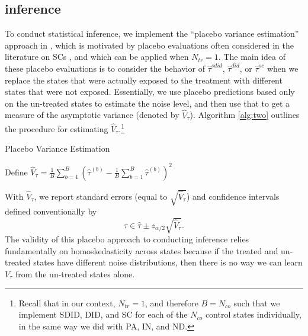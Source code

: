 \documentclass[../Main.tex]{subfiles}
\begin{document}
\subsection{inference}
To conduct statistical inference, we implement the ``placebo variance estimation'' approach in \citet{arkhangelsky2021synthetic}, which is motivated by placebo evaluations often considered in the literature on SCs \citep{abadie2010synthetic,abadie2015comparative}, and which can be applied when $N_{tr}=1$. The main idea of these placebo evaluations is to consider the behavior of $\hat{\tau}^{sdid}$, $\hat{\tau}^{did}$, or $\hat{\tau}^{sc}$ when we replace the states that were actually exposed to the treatment with different states that were not exposed. Essentially, we use placebo predictions based only on the un-treated states to estimate the noise level, and then use that to get a measure of the asymptotic variance (denoted by $\hat{V}_{\tau}$). Algorithm \ref{alg:two} outlines the procedure for estimating $\hat{V}_{\tau}$.\footnote{Recall that in our context, $N_{tr}=1$, and therefore $B=N_{co}$ such that we implement SDID, DID, and SC for each of the $N_{co}$ control states individually, in the same way we did with PA, IN, and ND.}
\vspace{.25cm}
\begin{center}
\begin{algorithm}[H]
\caption{Placebo Variance Estimation}\label{alg:two}
Define $\hat{V}_{\tau}=\frac{1}{B}\sum_{b=1}^B\left(\hat{\tau}^{(b)}-\frac{1}{B}\sum_{b=1}^B\hat{\tau}^{(b)}\right)^2$
\end{algorithm}
\end{center}
$~$\\
\indent With $\hat{V}_{\tau}$, we report standard errors (equal to $\sqrt{\hat{V}_{\tau}}$) and confidence intervals defined conventionally by
\begin{equation}
    \tau \in \hat{\tau} \pm z_{\alpha/2}\sqrt{\hat{V}_{\tau}}.
\end{equation}
The validity of this placebo approach to conducting inference relies fundamentally on homoskedasticity across states because if the treated and un-treated states have different noise distributions, then there is no way we can learn $V_{\tau}$ from the un-treated states alone.
\end{document}
